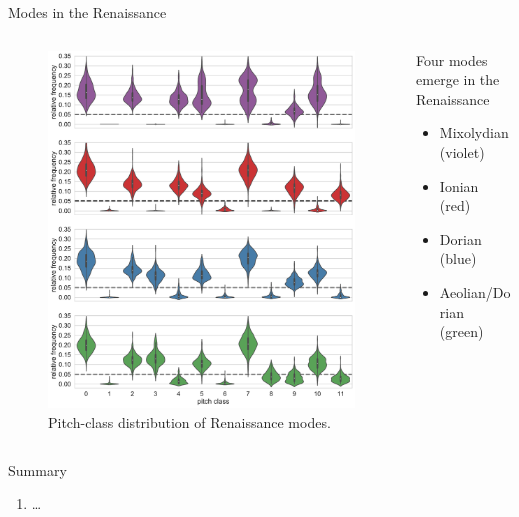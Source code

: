 \begin{frame}{Modes in the Renaissance}
    \begin{columns}
        \begin{column}{.6\linewidth}
            \begin{figure}
                \centering
                \includegraphics[width=\linewidth,height=.8\textheight,keepaspectratio]{img/Figure7.pdf}
                \caption{Pitch-class distribution of Renaissance modes.}
            \end{figure}
        \end{column}
        \hfill
        \begin{column}{.4\linewidth}
            Four modes emerge in the Renaissance
            
            \begin{itemize}
                \item Mixolydian (violet)
                \item Ionian (red)
                \item Dorian (blue)
                \item Aeolian/Dorian (green)
            \end{itemize}
        \end{column}
    \end{columns}
\end{frame}

\begin{frame}{Summary}
    \begin{enumerate}
        \item \ldots
    \end{enumerate}
\end{frame}
